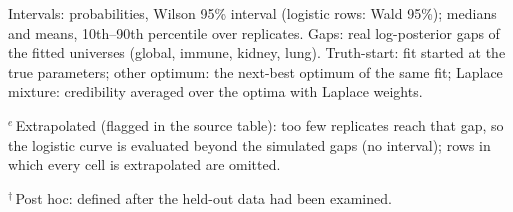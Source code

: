 \begin{table}[htbp]
\begin{minipage}{\linewidth}
Intervals: probabilities, Wilson 95\% interval (logistic rows: Wald 95\%); medians and means, 10th--90th percentile over replicates. Gaps: real log-posterior gaps of the fitted universes (global, immune, kidney, lung). Truth-start: fit started at the true parameters; other optimum: the next-best optimum of the same fit; Laplace mixture: credibility averaged over the optima with Laplace weights.

$^{e}$\,Extrapolated (flagged in the source table): too few replicates reach that gap, so the logistic curve is evaluated beyond the simulated gaps (no interval); rows in which every cell is extrapolated are omitted.

$^{\dagger}$\,Post hoc: defined after the held-out data had been examined.
\end{minipage}
\end{table}
